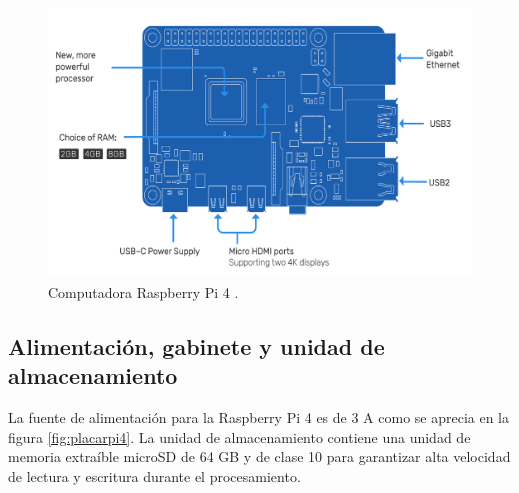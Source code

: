 \begin{figure}[htbp]
	\centering
	\includegraphics[width=1.0\textwidth]{./Figures/rpi4.png}
	\caption{Computadora Raspberry Pi 4 \protect\footnotemark. \citep{WEBSITE:7}}

	\label{fig:rpi4}
\end{figure}



\subsection{Alimentación, gabinete y unidad de almacenamiento}

La fuente de alimentación para la Raspberry Pi 4 es de 3 A como se aprecia en la figura \ref{fig:placarpi4}. La unidad de almacenamiento contiene una unidad de memoria extraíble microSD de 64 GB y de clase 10 para garantizar alta velocidad de lectura y escritura durante el procesamiento.

